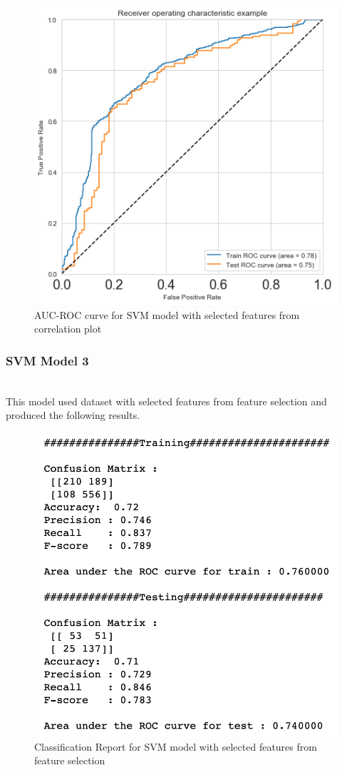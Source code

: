 \documentclass[format=sigconf]{acmart}
\begin{document}
\begin{figure}[H]
    \centering
    \includegraphics[scale=0.50]{AUC_ROC_SVM_Model_2.png}
    \caption{AUC-ROC curve for SVM model with selected features from correlation plot}
    \label{fig:aucrocmodel2}
\end{figure}

\subsubsection{SVM Model 3}
\hfill\\
This model used dataset with selected features from feature selection and produced the following results.

\begin{figure}[H]
    \centering
    \includegraphics[scale=0.50]{SVM_Model_3_results.png}
    \caption{Classification Report for SVM model with selected features from feature selection}
    \label{fig:svmmodel3}
\end{figure}
\end{document}
